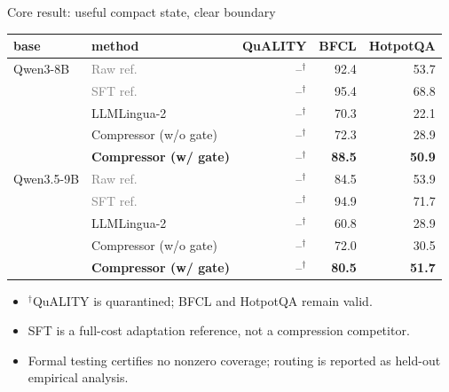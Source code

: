 \begin{frame}{Core result: useful compact state, clear boundary}
  \centering\scriptsize
  \begin{tabular}{llrrr}
  \toprule
  base & method & QuALITY & BFCL & HotpotQA \\
  \midrule
  Qwen3-8B & \textcolor{gray}{Raw ref.} & --$^\dagger$ & 92.4 & 53.7 \\
            & \textcolor{gray}{SFT ref.} & --$^\dagger$ & 95.4 & 68.8 \\
            & LLMLingua-2 & --$^\dagger$ & 70.3 & 22.1 \\
            & Compressor (w/o gate) & --$^\dagger$ & 72.3 & 28.9 \\
            & \textbf{Compressor (w/ gate)} & --$^\dagger$ & \textbf{88.5} & \textbf{50.9} \\
  \midrule
  Qwen3.5-9B & \textcolor{gray}{Raw ref.} & --$^\dagger$ & 84.5 & 53.9 \\
              & \textcolor{gray}{SFT ref.} & --$^\dagger$ & 94.9 & 71.7 \\
              & LLMLingua-2 & --$^\dagger$ & 60.8 & 28.9 \\
              & Compressor (w/o gate) & --$^\dagger$ & 72.0 & 30.5 \\
              & \textbf{Compressor (w/ gate)} & --$^\dagger$ & \textbf{80.5} & \textbf{51.7} \\
  \bottomrule
  \end{tabular}
  \vspace{0.45em}
  \begin{itemize}\footnotesize
    \item $^\dagger$QuALITY is quarantined; BFCL and HotpotQA remain valid.
    \item SFT is a full-cost adaptation reference, not a compression competitor.
    \item Formal testing certifies no nonzero coverage; routing is reported as held-out empirical analysis.
  \end{itemize}
\end{frame}

